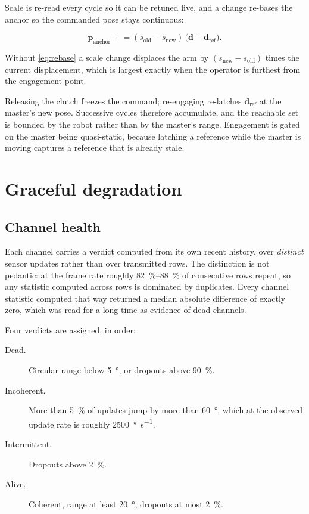 Scale is re-read every cycle so it can be retuned live, and a change re-bases
the anchor so the commanded pose stays continuous:

\begin{equation}
  \mathbf{p}_{\text{anchor}} \mathrel{+}= (s_{\text{old}} - s_{\text{new}})\,
  \bigl(\mathbf{d} - \mathbf{d}_{\text{ref}}\bigr).
  \label{eq:rebase}
\end{equation}

Without \cref{eq:rebase} a scale change displaces the arm by
$(s_{\text{new}} - s_{\text{old}})$ times the current displacement, which is
largest exactly when the operator is furthest from the engagement point.

Releasing the clutch freezes the command; re-engaging re-latches
$\mathbf{d}_{\text{ref}}$ at the master's new pose. Successive cycles
therefore accumulate, and the reachable set is bounded by the robot rather
than by the master's range. Engagement is gated on the master being
quasi-static, because latching a reference while the master is moving captures
a reference that is already stale.

\section{Graceful degradation}

\subsection{Channel health}

Each channel carries a verdict computed from its own recent history, over
\emph{distinct} sensor updates rather than over transmitted rows. The
distinction is not pedantic: at the frame rate roughly
\SIrange{82}{88}{\percent} of consecutive rows repeat, so any statistic
computed across rows is dominated by duplicates. Every channel statistic
computed that way returned a median absolute difference of exactly zero, which
was read for a long time as evidence of dead channels.

Four verdicts are assigned, in order:

\begin{description}
  \item[Dead.] Circular range below \SI{5}{\degree}, or dropouts above
    \SI{90}{\percent}.
  \item[Incoherent.] More than \SI{5}{\percent} of updates jump by more than
    \SI{60}{\degree}, which at the observed update rate is roughly
    \SI{2500}{\degree\per\second}.
  \item[Intermittent.] Dropouts above \SI{2}{\percent}.
  \item[Alive.] Coherent, range at least \SI{20}{\degree}, dropouts at most
    \SI{2}{\percent}.
\end{description}

